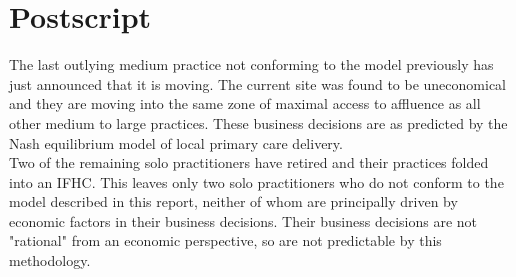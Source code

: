 \documentclass[11pt,a4paper]{article}
\begin{document}
\section{Postscript}
The last outlying medium practice not conforming to the model previously has just announced that it is moving. The current site was found to be uneconomical and they are moving into the same zone of maximal access to affluence as all other medium to large practices. These business decisions are as predicted by the Nash equilibrium model of local primary care delivery. \\


Two of the remaining solo practitioners have retired and their practices folded into an IFHC. This leaves only two solo practitioners who  do not conform to the model described in this report, neither  of whom are principally driven by economic factors in their business decisions. Their business decisions are not "rational" from an economic perspective, so are not predictable by this methodology.\\ 


\pagebreak



\end{document}

